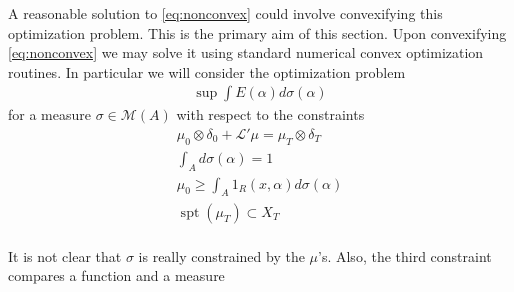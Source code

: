 A reasonable solution to \eqref{eq:nonconvex} could involve convexifying this optimization problem.
This is the primary aim of this section.  Upon convexifying \eqref{eq:nonconvex} we may solve it using standard numerical convex optimization routines.
In particular we will consider the optimization problem
\begin{align*}
	\sup \int E(\alpha) d\sigma(\alpha)
\end{align*}
for a measure $\sigma \in \mathcal{M}(A)$ with respect to the constraints
\begin{align*}
	\mu_{0} \otimes \delta_{0} + \mathcal{L}' \mu = \mu_{T} \otimes \delta_{T} \\
	\int_{A} d\sigma(\alpha) = 1 \\
	\mu_{0} \geq \int_{A} 1_{R}(x,\alpha) d\sigma(\alpha) \\
	\operatorname{spt}(\mu_{T}) \subset X_{T} \\
\end{align*}

{\color{red}  It is not clear that $\sigma$ is really constrained by the $\mu$'s.  Also, the third constraint compares a function and a measure}